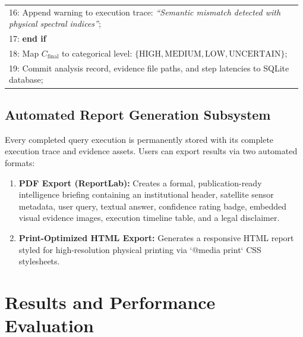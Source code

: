 \documentclass[12pt,a4paper]{report}
\begin{document}
\begin{singlespacing}
\begin{table}[htbp]
{\begin{tabular}{@{}p{0.98\linewidth}@{}}
16: \quad Append warning to execution trace: \textit{``Semantic mismatch detected with physical spectral indices''}; \\
17: \textbf{end if} \\
18: Map $C_{\text{final}}$ to categorical level: $\{\text{HIGH}, \text{MEDIUM}, \text{LOW}, \text{UNCERTAIN}\}$; \\
19: Commit analysis record, evidence file paths, and step latencies to SQLite database; \\
\bottomrule
\end{tabular}%
}
\end{table}
\end{singlespacing}

\section{Automated Report Generation Subsystem}
Every completed query execution is permanently stored with its complete execution trace and evidence assets. Users can export results via two automated formats:
\begin{enumerate}
    \item \textbf{PDF Export (ReportLab):} Creates a formal, publication-ready intelligence briefing containing an institutional header, satellite sensor metadata, user query, textual answer, confidence rating badge, embedded visual evidence images, execution timeline table, and a legal disclaimer.
    \item \textbf{Print-Optimized HTML Export:} Generates a responsive HTML report styled for high-resolution physical printing via `@media print` CSS stylesheets.
\end{enumerate}

\chapter{Results and Performance Evaluation}
\end{document}
